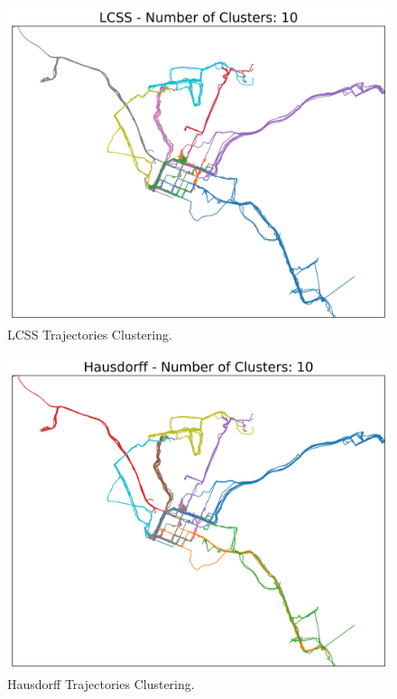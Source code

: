 \documentclass[a4paper, 12pt]{article}
\begin{document}
\begin{figure}[htbp!]
    \centering
    \includegraphics[width=1\textwidth]{lcss_trajectory_clustering.png}
    \caption{LCSS Trajectories Clustering.}
    \label{fig21}
\end{figure}

\begin{figure}[htbp!]
    \centering
    \includegraphics[width=1\textwidth]{hausdorff_trajectory_clustering.png}
    \caption{Hausdorff Trajectories Clustering.}
    \label{fig22}
\end{figure}
\end{document}
